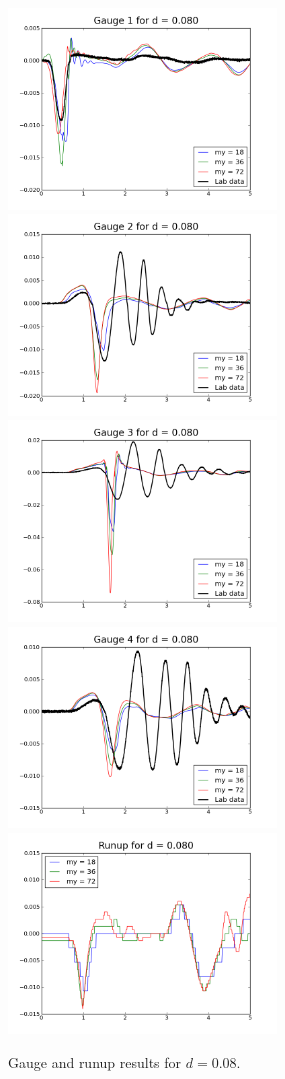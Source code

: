 \begin{figure}[ht]

\hfil\includegraphics[width=2.8in]{bp3/gauge1-d0-08.png}\hfil
\hfil\includegraphics[width=2.8in]{bp3/gauge2-d0-08.png}\hfil
\vskip 10pt
\hfil\includegraphics[width=2.8in]{bp3/gauge3-d0-08.png}\hfil
\hfil\includegraphics[width=2.8in]{bp3/gauge4-d0-08.png}\hfil
\vskip 10pt
\hfil\includegraphics[width=2.8in]{bp3/runup-d0-08.png}\hfil

\caption{\label{fig:bp3gauge2} 
Gauge and runup results for $d=0.08$.
  }
\end{figure}



